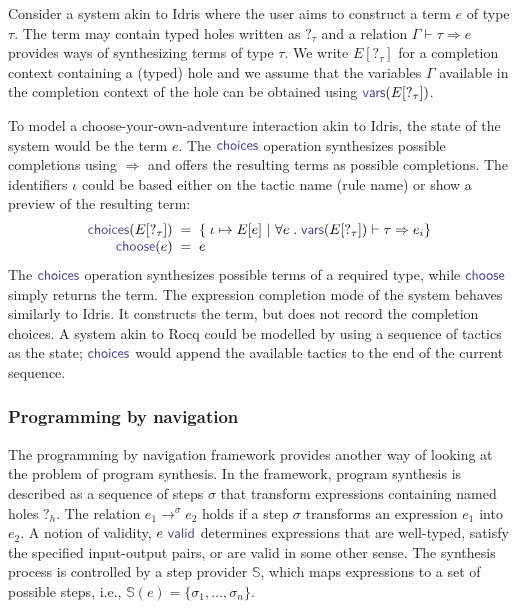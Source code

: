 \documentclass[nonacm,anonymous,sigplan,screen]{acmart}
\newcommand{\ident}[1]{\textsf{\color{DarkSlateBlue}{#1}}}
\newcommand{\select}{\textnormal{\ident{choose}}}
\newcommand{\choices}{\textnormal{\ident{choices}}}
\begin{document}
Consider a system akin to Idris where the user aims to construct a term $e$ of type
$\tau$. The term may contain typed holes written as $?_\tau$ and a relation $\Gamma\vdash \tau\Rightarrow e$
provides ways of synthesizing terms of type $\tau$. We write $E[?_\tau]$ for a
completion context containing a (typed) hole and we assume that the variables $\Gamma$ available in
the completion context of the hole can be obtained using $\ident{vars}(E[?_\tau])$.

To model a choose-your-own-adventure interaction akin to Idris, the state of the system
would be the term $e$. The $\choices$ operation synthesizes
possible completions using $\Rightarrow$ and offers the resulting terms as possible completions.
The identifiers $\iota$ could be based either on the tactic name (rule name) or show a preview
of the resulting term:
\[
\begin{array}{r@{\;\;}c@{\;\;}l}
\choices(E[?_\tau]) &=& \{\; \iota \mapsto E[e] ~|~ \forall e\;.\; \ident{vars}(E[?_\tau]) \vdash \tau \Rightarrow e_i \}\\
\select(e) &=& e
\end{array}
\]
The $\choices$ operation synthesizes possible terms of a required type, while $\select$ simply
returns the term. The expression completion
mode of the system behaves similarly to Idris. It constructs the term, but does not record the
completion choices. A system akin to Rocq could be modelled by using a sequence of
tactics as the state; $\choices$ would append the available tactics to the end of the current sequence.

\subsubsection*{Programming by navigation}

The programming by navigation framework \cite{lubin-2025-pbn} provides another way of looking
at the problem of program synthesis. In the framework, program synthesis is described as a
sequence of steps $\sigma$ that transform expressions containing named holes $?_h$.
The relation $e_1 \rightarrow^{\sigma} e_2$ holds if a step $\sigma$ transforms
an expression $e_1$ into $e_2$. A notion of validity, $e~\ident{valid}$ determines expressions
that are well-typed, satisfy the specified input-output pairs, or are valid in some other sense.
The synthesis process is controlled by a step provider $\mathbb{S}$, which maps expressions to a
set of possible steps, i.e., $\mathbb{S}(e)=\{ \sigma_1, \ldots, \sigma_n \}$.
\end{document}
